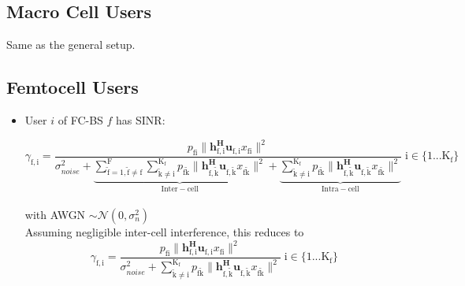 \documentclass[12pt,a4paper]{report}
\begin{document}
\subsection{Macro Cell Users}
Same as the general setup.

\subsection{Femtocell Users}
\begin{itemize}



\item User $i$ of FC-BS $f$ has SINR:

	\begin{equation*}
	\gamma_{\mathrm{f,i}} = 
	\frac{p_{\mathrm{fi}}\|\mathbf{h^H_{\mathrm{f,i}}u_{\mathrm{f,i}}}x_{\mathrm{fi}}\|^2}
	{\sigma^2_{noise}   +
	\underbrace{
	\sum_{\mathrm{\tilde{f}=1,\tilde{f} \neq f}}^{\mathrm{F}}
	\sum_{\mathrm{\tilde{k}\neq i}}^{\mathrm{K_f}}
	  p_{\mathrm{f\tilde{k}}}\|\mathbf{h^H_{\mathrm{f,\tilde{k}}}u_{\mathrm{f,\tilde{k}}}}x_{\mathrm{f\tilde{k}}}\|^2}_
	  {\mathrm{Inter-cell}}+ \underbrace{
	\sum_{\mathrm{\tilde{k}\neq i}}^{\mathrm{K_f}}
	  p_{\mathrm{f\tilde{k}}}\|\mathbf{h^H_{\mathrm{f,\tilde{k}}}u_{\mathrm{f,\tilde{k}}}}x_{\mathrm{f\tilde{k}}}\|^2}
	 _{\mathrm{Intra-cell}}}
	  \; \mathrm{i \in \{1 ... K_f\}}\end{equation*}
\\
with AWGN $\sim \mathcal{N}(0,\sigma^2_n)$
\\

Assuming negligible inter-cell interference, this reduces to
	\begin{equation*} \label{user_sinr}
	\gamma_{\mathrm{f,i}} = \frac{p_{\mathrm{fi}}\|\mathbf{h^H_{\mathrm{f,i}}
	u_{\mathrm{f,i}}}x_{\mathrm{fi}}\|^2}
	{\sigma^2_{noise} 
	 + \sum_{\mathrm{\tilde{k}\neq i}}^{\mathrm{K_f}}
	  p_{\mathrm{f\tilde{k}}}\|\mathbf{h^H_{\mathrm{f,\tilde{k}}}u_{\mathrm{f,\tilde{k}}}}x_{\mathrm{f\tilde{k}}}\|^2}
	  \; \mathrm{i \in \{1 ... K_f\}}
	\end{equation*}
\\

%

\end{itemize}
\end{document}
